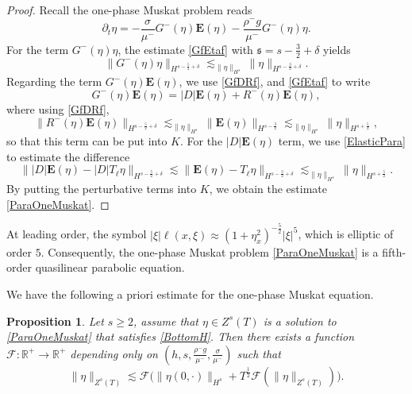 \documentclass[12pt]{amsart}
\newtheorem{proposition}[theorem]{Proposition}
\theoremstyle{definition}
\numberwithin{equation}{section}
\newcommand{\p}{\partial}
\newcommand{\R}{\mathbb{R}}
\newcommand{\f}{\frac}
\begin{document}
\begin{proof}
Recall the one-phase Muskat problem reads
\begin{equation*}
  \p_t \eta = -\frac{\sigma}{\mu^-}G^-(\eta) \mathbf{E}(\eta) -\frac{\rho^-g}{\mu^-} G^-(\eta)\eta.
\end{equation*}
For the term $G^-(\eta)\eta$, the estimate \eqref{GfEtaf} with $\mathfrak{s} = s-\f32+\delta$ yields
\begin{equation*}
   \| G^-(\eta)\eta\|_{H^{s-\f52+\delta}} \lesssim_{\|\eta\|_{H^s}} \|\eta\|_{H^{s-\f32+\delta}}.
\end{equation*}
Regarding the term $G^-(\eta) \mathbf{E}(\eta)$, we use \eqref{GfDRf}, and \eqref{GfEtaf} to write
\begin{equation*}
 G^-(\eta) \mathbf{E}(\eta) = |D|\mathbf{E}(\eta) + R^{-}(\eta)\mathbf{E}(\eta),
\end{equation*}
where using \eqref{GfDRf},
\begin{equation*}
 \| R^{-}(\eta)\mathbf{E}(\eta) \|_{H^{s-\f52+\delta}} \lesssim_{\|\eta\|_{H^s}} \|\mathbf{E}(\eta) \|_{H^{s-\f32}} \lesssim_{\|\eta\|_{H^s}} \|\eta\|_{H^{s+\f52}},
\end{equation*}
so that this term can be put into $K$.
For the $|D|\mathbf{E}(\eta)$ term, we use \eqref{ElasticPara} to estimate the difference
\begin{equation*}
\||D|\mathbf{E}(\eta) - |D|T_{\ell}\eta \|_{H^{s-\f52+\delta}} \lesssim  \|\mathbf{E}(\eta) - T_{\ell}\eta \|_{H^{s-\f32+\delta}}\lesssim_{\|\eta\|_{H^s}} \|\eta\|_{H^{s+\f52}}.    
\end{equation*}
By putting the perturbative terms into $K$, we obtain the estimate \eqref{ParaOneMuskat}.
\end{proof}

At leading order, the symbol $|\xi|\ell(x,\xi) \approx (1+\eta_x^2)^{-\f52}|\xi|^5$, which is elliptic of order $5$.
Consequently, the one-phase Muskat problem \eqref{ParaOneMuskat} is a fifth-order quasilinear parabolic equation.

We have the following a priori estimate for the one-phase Muskat equation.
\begin{proposition} \label{t:OnePhaseEst}
Let $s\geq2$, assume that $\eta \in Z^s(T)$ is a solution to \eqref{ParaOneMuskat} that satisfies \eqref{BottomH}.
Then there exists a function $\mathcal{F}: \R^+ \rightarrow \R^+$ depending only on $(h,s,\frac{\rho^- g}{\mu^-},\frac{\sigma}{\mu^-})$ such that
\begin{equation} \label{OneAprioriEst}
  \| \eta\|_{Z^s(T)} \lesssim \mathcal{F}\big(\|\eta(0,\cdot)\|_{H^s} + T^\f12\mathcal{F}( \| \eta\|_{Z^s(T)})\big).
\end{equation}
\end{proposition}
\end{document}
